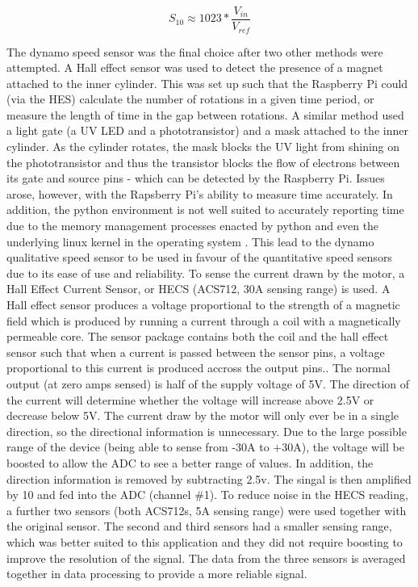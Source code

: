 \documentclass[twoside,a4]{report}
\def\br{\newline \newline \noindent}
\begin{document}
	\begin{equation}
		S_{10} \approx 1023 * \frac{V_{in}}{V_{ref}}
		\label{eqnadc}
	\end{equation}
	
	
	\noindent
	The dynamo speed sensor was the final choice after two other methods were attempted. A Hall effect sensor was used to detect the presence of a magnet attached to the inner cylinder. This was set up such that the Raspberry Pi could (via the HES) calculate the number of rotations in a given time period, or measure the length of time in the gap between rotations. A similar method used a light gate (a UV LED and a phototransistor) and a mask attached to the inner cylinder. As the cylinder rotates, the mask blocks the UV light from shining on the phototransistor and thus the transistor blocks the flow of electrons between its gate and source pins - which can be detected by the Raspberry Pi. Issues arose, however, with the Rapsberry Pi's ability to measure time accurately. In addition, the python environment is not well suited to accurately reporting time due to the memory management processes enacted by python and even the underlying linux kernel in the operating system \cite{backrpibadrealtime}. This lead to the dynamo qualitative speed sensor to be used in favour of the quantitative speed sensors due to its ease of use and reliability.
	\br
	To sense the current drawn by the motor, a Hall Effect Current Sensor, or HECS (ACS712, 30A sensing range) is used. A Hall effect sensor produces a voltage proportional to the strength of a magnetic field which is produced by running a current through a coil with a magnetically permeable core. The sensor package contains both the coil and the hall effect sensor such that when a current is passed between the sensor pins, a voltage proportional to this current is produced accross the output pins.. The normal output (at zero amps sensed) is half of the supply voltage of 5V. The direction of the current will determine whether the voltage will increase above 2.5V or decrease below 5V. The current draw by the motor will only ever be in a single direction, so the directional information is unnecessary. Due to the large possible range of the device (being able to sense from -30A to +30A), the voltage will be boosted to allow the ADC to see a better range of values. In addition, the direction information is removed by subtracting 2.5v. The singal is then amplified by 10 and fed into the ADC (channel \#1). 
	\br
	To reduce noise in the HECS reading, a further two sensors (both ACS712s, 5A sensing range) were used together with the original sensor. The second and third sensors had a smaller sensing range, which was better suited to this application and they did not require boosting to improve the resolution of the signal. The data from the three sensors is averaged together in data processing to provide a more reliable signal.
\end{document}
